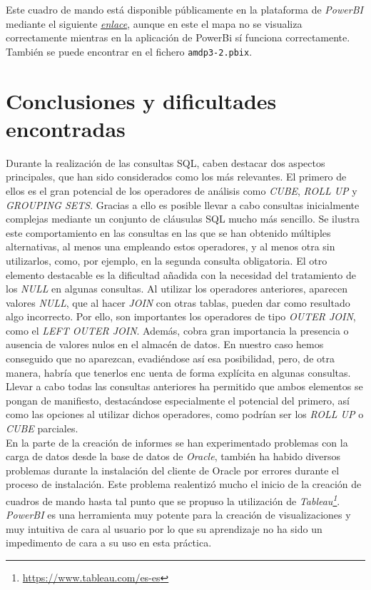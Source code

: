 \documentclass{article}
\begin{document}
Este cuadro de mando está disponible públicamente en la plataforma de \textit{PowerBI} mediante el siguiente \href{https://app.powerbi.com/view?r=eyJrIjoiYzJkMWI2MmQtZWI4OC00NGM5LTg4NDEtZWVhZTVmM2I2NmMzIiwidCI6IjNmMjI3ZGJhLWYzZjQtNDU0NC1iMzE0LWM2ZWZkMzBlMGQwMCIsImMiOjh9}{\textit{enlace}}, aunque en este el mapa no se visualiza correctamente mientras en la aplicación de PowerBi sí funciona correctamente. También se puede encontrar en el fichero \texttt{amdp3-2.pbix}.\\


\newpage
\section{Conclusiones y dificultades encontradas}

Durante la realización de las consultas SQL, caben destacar dos aspectos principales, que han sido considerados como los más relevantes. El primero de ellos es el gran potencial de los operadores de análisis como \textit{CUBE}, \textit{ROLL UP} y \textit{GROUPING SETS}. Gracias a ello es posible llevar a cabo consultas inicialmente complejas mediante un conjunto de cláusulas SQL mucho más sencillo. Se ilustra este comportamiento en las consultas en las que se han obtenido múltiples alternativas, al menos una empleando estos operadores, y al menos otra sin utilizarlos, como, por ejemplo, en la segunda consulta obligatoria. El otro elemento destacable es la dificultad añadida con la necesidad del tratamiento de los \textit{NULL} en algunas consultas. Al utilizar los operadores anteriores, aparecen valores \textit{NULL}, que al hacer \textit{JOIN} con otras tablas, pueden dar como resultado algo incorrecto. Por ello, son importantes los operadores de tipo \textit{OUTER JOIN}, como el \textit{LEFT OUTER JOIN}. Además, cobra gran importancia la presencia o ausencia de valores nulos en el almacén de datos. En nuestro caso hemos conseguido que no aparezcan, evadiéndose así esa posibilidad, pero, de otra manera, habría que tenerlos enc uenta de forma explícita en algunas consultas. Llevar a cabo todas las consultas anteriores ha permitido que ambos elementos se pongan de manifiesto, destacándose especialmente el potencial del primero, así como las opciones al utilizar dichos operadores, como podrían ser los \textit{ROLL UP} o \textit{CUBE} parciales.\\
En la parte de la creación de informes se han experimentado problemas con la carga de datos desde la base de datos de \textit{Oracle}, también ha habido diversos problemas durante la instalación del cliente de Oracle por errores durante el proceso de instalación. Este problema realentizó mucho el inicio de la creación de cuadros de mando hasta tal punto que se propuso la utilización de \textit{Tableau\footnote{\url{https://www.tableau.com/es-es}}}. \textit{PowerBI} es una herramienta muy potente para la creación de visualizaciones y muy intuitiva de cara al usuario por lo que su aprendizaje no ha sido un impedimento de cara a su uso en esta práctica.\\
\end{document}
